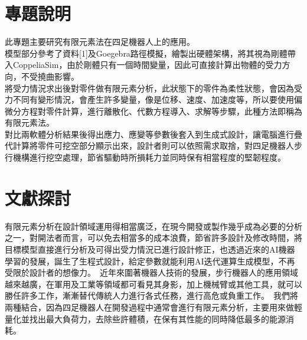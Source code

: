 \section{專題說明}
此專題主要研究有限元素法在四足機器人上的應用。\\
模型部分參考了資料[1]及Goegebra路徑模擬，繪製出硬體架構，將其視為剛體帶入CoppeliaSim，由於剛體只有一個時間變量，因此可直接計算出物體的受力方向，不受撓曲影響。\\
將受力情況求出後對零件做有限元素分析，此狀態下的零件為柔性狀態，會因為受力不同有變形情況，會產生許多變量，像是位移、速度、加速度等，所以要使用偏微分方程對零件計算，進行離散化、代數方程導入、求解等步驟，此種方法即稱為有限元素法。\\
對比兩軟體分析結果後得出應力、應變等參數後套入到生成式設計，讓電腦進行疊代計算將零件可挖空部分顯示出來，設計者則可以依照需求取捨，對四足機器人步行機構進行挖空處理，節省驅動時所損耗力並同時保有相當程度的堅韌程度。\\

\section{文獻探討}

有限元素分析在設計領域運用得相當廣泛，在現今開發或製作幾乎成為必要的分析之一，對開法者而言，可以免去相當多的成本浪費，節省許多設計及修改時間，將目標模型直接進行分析及可得出受力情況已進行設計修正，也透過近來的AI機器學習的發展，誕生了生程式設計，給定參數就能利用AI迭代運算生成模型，不再受限於設計者的想像力。\
近年來圍著機器人技術的發展，步行機器人的應用領域越來越廣，在軍用及工業等領域都可看見其身影，加上機械臂或其他工具，就可以勝任許多工作，漸漸替代傳統人力進行各式任務，進行高危或負重工作。\
我們將兩種結合，因為四足機器人在開發過程中通常會進行有限元素分析，主要用來做輕量化並找出最大負荷力，去除些許體積，在保有其性能的同時降低最多的能源消耗。\

\renewcommand{\baselinestretch}{0.5} %
